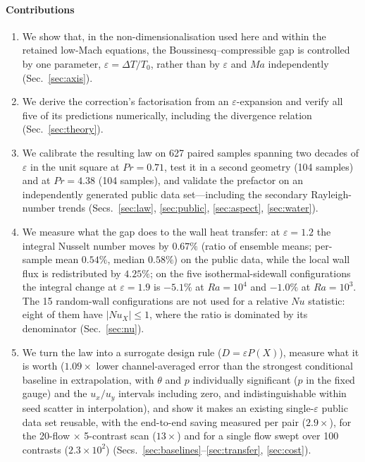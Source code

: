 \documentclass[preprint,11pt,a4paper,times,doubleblind]{elsarticle}
\begin{document}
\paragraph{Contributions}
\begin{enumerate}
\item We show that, in the non-dimensionalisation used here and within the retained low-Mach
equations, the Boussinesq--compressible gap is controlled by one parameter,
$\varepsilon=\Delta T/T_0$, rather than by $\varepsilon$ and $Ma$ independently
(Sec.~\ref{sec:axis}).
\item We derive the correction's factorisation from an $\varepsilon$-expansion and verify all five
of its predictions numerically, including the divergence relation (Sec.~\ref{sec:theory}).
\item We calibrate the resulting law on 627 paired samples spanning two decades of $\varepsilon$
in the unit square at $Pr=0.71$, test it in a second geometry (104 samples) and at $Pr=4.38$ (104
samples), and validate the prefactor on an independently generated public data set---including the secondary
Rayleigh-number trends (Secs.~\ref{sec:law}, \ref{sec:public}, \ref{sec:aspect}, \ref{sec:water}).
\item We measure what the gap does to the wall heat transfer: at $\varepsilon=1.2$ the integral
Nusselt number moves by $0.67\%$ (ratio of ensemble means; per-sample mean $0.54\%$,
median $0.58\%$) on the public data, while the local wall flux
is redistributed by $4.25\%$; on the five isothermal-sidewall configurations the integral change
at $\varepsilon=1.9$ is $-5.1\%$ at $Ra=10^4$ and $-1.0\%$ at $Ra=10^3$. The 15 random-wall
configurations are not used for a relative $Nu$ statistic: eight of them have $|Nu_X|\le1$, where
the ratio is dominated by its denominator (Sec.~\ref{sec:nu}).
\item We turn the law into a surrogate design rule ($D=\varepsilon P(X)$), measure what it is worth
($1.09\times$ lower channel-averaged error than the strongest conditional baseline in
extrapolation, with $\theta$ and $p$ individually significant ($p$ in the fixed gauge) and the $u_x/u_y$ intervals
including zero, and indistinguishable within seed scatter in interpolation), and show it makes an existing single-$\varepsilon$ public data set
reusable, with the end-to-end saving measured per pair ($2.9\times$), for the 20-flow
$\times$ 5-contrast scan ($13\times$) and for a single flow swept over 100 contrasts
($2.3\times10^2$)
(Secs.~\ref{sec:baselines}--\ref{sec:transfer}, \ref{sec:cost}).
\end{enumerate}
\end{document}
